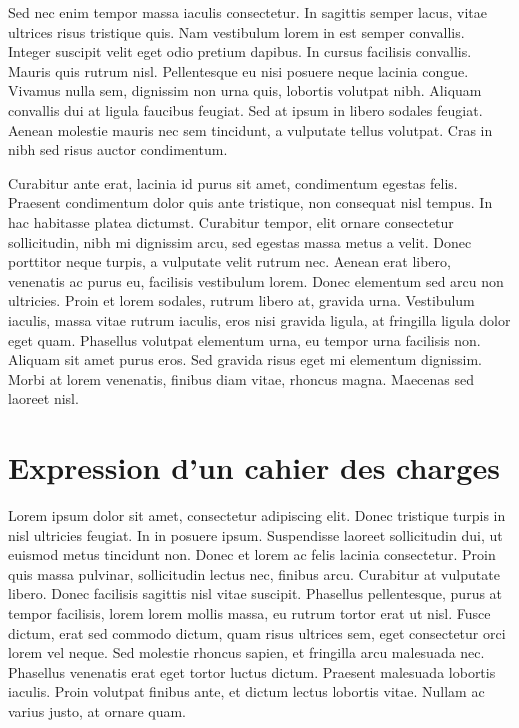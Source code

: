 \documentclass[a4paper,12pt]{report}
\begin{document}
Sed nec enim tempor massa iaculis consectetur. In sagittis semper lacus, vitae ultrices risus tristique quis. Nam vestibulum lorem in est semper convallis. Integer suscipit velit eget odio pretium dapibus. In cursus facilisis convallis. Mauris quis rutrum nisl. Pellentesque eu nisi posuere neque lacinia congue. Vivamus nulla sem, dignissim non urna quis, lobortis volutpat nibh. Aliquam convallis dui at ligula faucibus feugiat. Sed at ipsum in libero sodales feugiat. Aenean molestie mauris nec sem tincidunt, a vulputate tellus volutpat. Cras in nibh sed risus auctor condimentum.

Curabitur ante erat, lacinia id purus sit amet, condimentum egestas felis. Praesent condimentum dolor quis ante tristique, non consequat nisl tempus. In hac habitasse platea dictumst. Curabitur tempor, elit ornare consectetur sollicitudin, nibh mi dignissim arcu, sed egestas massa metus a velit. Donec porttitor neque turpis, a vulputate velit rutrum nec. Aenean erat libero, venenatis ac purus eu, facilisis vestibulum lorem. Donec elementum sed arcu non ultricies. Proin et lorem sodales, rutrum libero at, gravida urna. Vestibulum iaculis, massa vitae rutrum iaculis, eros nisi gravida ligula, at fringilla ligula dolor eget quam. Phasellus volutpat elementum urna, eu tempor urna facilisis non. Aliquam sit amet purus eros. Sed gravida risus eget mi elementum dignissim. Morbi at lorem venenatis, finibus diam vitae, rhoncus magna. Maecenas sed laoreet nisl.

\section{Expression d'un cahier des charges} %
Lorem ipsum dolor sit amet, consectetur adipiscing elit. Donec tristique turpis in nisl ultricies feugiat. In in posuere ipsum. Suspendisse laoreet sollicitudin dui, ut euismod metus tincidunt non. Donec et lorem ac felis lacinia consectetur. Proin quis massa pulvinar, sollicitudin lectus nec, finibus arcu. Curabitur at vulputate libero. Donec facilisis sagittis nisl vitae suscipit. Phasellus pellentesque, purus at tempor facilisis, lorem lorem mollis massa, eu rutrum tortor erat ut nisl. Fusce dictum, erat sed commodo dictum, quam risus ultrices sem, eget consectetur orci lorem vel neque. Sed molestie rhoncus sapien, et fringilla arcu malesuada nec. Phasellus venenatis erat eget tortor luctus dictum. Praesent malesuada lobortis iaculis. Proin volutpat finibus ante, et dictum lectus lobortis vitae. Nullam ac varius justo, at ornare quam.
\end{document}
